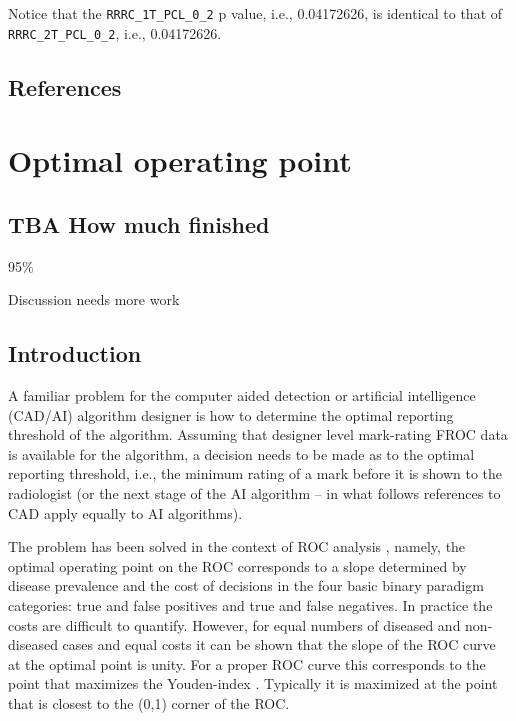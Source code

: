 \documentclass[
]{book}
\begin{document}
Notice that the \texttt{RRRC\_1T\_PCL\_0\_2} p value, i.e., 0.04172626, is identical to that of \texttt{RRRC\_2T\_PCL\_0\_2}, i.e., 0.04172626.

\hypertarget{standalone-cad-radiologists-references}{%
\section{References}\label{standalone-cad-radiologists-references}}

\hypertarget{optim-op-point}{%
\chapter{Optimal operating point}\label{optim-op-point}}

\hypertarget{optim-op-point-how-much-finished}{%
\section{TBA How much finished}\label{optim-op-point-how-much-finished}}

95\%

Discussion needs more work

\hypertarget{optim-op-point-intro}{%
\section{Introduction}\label{optim-op-point-intro}}

A familiar problem for the computer aided detection or artificial intelligence (CAD/AI) algorithm designer is how to determine the optimal reporting threshold of the algorithm. Assuming that designer level mark-rating FROC data is available for the algorithm, a decision needs to be made as to the optimal reporting threshold, i.e., the minimum rating of a mark before it is shown to the radiologist (or the next stage of the AI algorithm -- in what follows references to CAD apply equally to AI algorithms).

The problem has been solved in the context of ROC analysis \citep{metz1978rocmethodology}, namely, the optimal operating point on the ROC corresponds to a slope determined by disease prevalence and the cost of decisions in the four basic binary paradigm categories: true and false positives and true and false negatives. In practice the costs are difficult to quantify. However, for equal numbers of diseased and non-diseased cases and equal costs it can be shown that the slope of the ROC curve at the optimal point is unity. For a proper ROC curve this corresponds to the point that maximizes the Youden-index \citep{youden1950index}. Typically it is maximized at the point that is closest to the (0,1) corner of the ROC.
\end{document}
